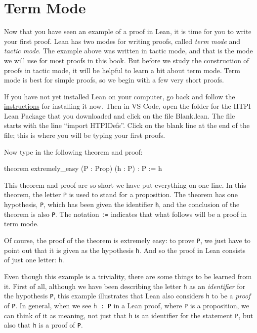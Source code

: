 \documentclass[
  letterpaper,
  DIV=11,
  numbers=noendperiod]{scrreprt}
\newenvironment{Shaded}{\begin{snugshade}}{\end{snugshade}}
\newcommand{\KeywordTok}[1]{\textcolor[rgb]{0.00,0.23,0.31}{#1}}
\newcommand{\NormalTok}[1]{\textcolor[rgb]{0.00,0.23,0.31}{#1}}
\renewcommand{\KeywordTok}[1]{\textcolor[HTML]{0000FF}{#1}}
\begin{document}
\hypertarget{term-mode}{%
\section*{Term Mode}\label{term-mode}}

Now that you have seen an example of a proof in Lean, it is time for you
to write your first proof. Lean has two modes for writing proofs, called
\emph{term mode} and \emph{tactic mode}. The example above was written
in tactic mode, and that is the mode we will use for most proofs in this
book. But before we study the construction of proofs in tactic mode, it
will be helpful to learn a bit about term mode. Term mode is best for
simple proofs, so we begin with a few very short proofs.

If you have not yet installed Lean on your computer, go back and follow
the \protect\hyperlink{installing-lean}{instructions} for installing it
now. Then in VS Code, open the folder for the HTPI Lean Package that you
downloaded and click on the file Blank.lean. The file starts with the
line ``import HTPIDefs''. Click on the blank line at the end of the
file; this is where you will be typing your first proofs.

Now type in the following theorem and proof:

\begin{Shaded}
\begin{Highlighting}[]
\KeywordTok{theorem}\NormalTok{ extremely\_easy (P : }\KeywordTok{Prop}\NormalTok{) (h : P) : P := h}
\end{Highlighting}
\end{Shaded}

This theorem and proof are so short we have put everything on one line.
In this theorem, the letter \texttt{P} is used to stand for a
proposition. The theorem has one hypothesis, \texttt{P}, which has been
given the identifier \texttt{h}, and the conclusion of the theorem is
also \texttt{P}. The notation \texttt{:=} indicates that what follows
will be a proof in term mode.

Of course, the proof of the theorem is extremely easy: to prove
\texttt{P}, we just have to point out that it is given as the hypothesis
\texttt{h}. And so the proof in Lean consists of just one letter:
\texttt{h}.

Even though this example is a triviality, there are some things to be
learned from it. First of all, although we have been describing the
letter \texttt{h} as an \emph{identifier} for the hypothesis \texttt{P},
this example illustrates that Lean also considers \texttt{h} to be a
\emph{proof} of \texttt{P}. In general, when we see \texttt{h\ :\ P} in
a Lean proof, where \texttt{P} is a proposition, we can think of it as
meaning, not just that \texttt{h} is an identifier for the statement
\texttt{P}, but also that \texttt{h} is a proof of \texttt{P}.
\end{document}
